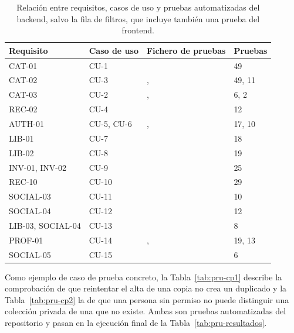 \begin{table}[htp]
\centering
\small
\begin{tabularx}{\textwidth}{ | C{0.17\textwidth} | C{0.13\textwidth} | Y | C{0.12\textwidth} | }
    \hline
    \textbf{Requisito} & \textbf{Caso de uso} & \textbf{Fichero de pruebas} & \textbf{Pruebas} \\
    \hline
    CAT-01 & CU-1 &  & 49 \\
    \hline
    CAT-02 & CU-3 & ,  & 49, 11 \\
    \hline
    CAT-03 & CU-2 & ,  & 6, 2 \\
    \hline
    REC-02 & CU-4 &  & 12 \\
    \hline
    AUTH-01 & CU-5, CU-6 & ,  & 17, 10 \\
    \hline
    LIB-01 & CU-7 &  & 18 \\
    \hline
    LIB-02 & CU-8 &  & 19 \\
    \hline
    INV-01, INV-02 & CU-9 &  & 25 \\
    \hline
    REC-10 & CU-10 &  & 29 \\
    \hline
    SOCIAL-03 & CU-11 &  & 10 \\
    \hline
    SOCIAL-04 & CU-12 &  & 12 \\
    \hline
    LIB-03, SOCIAL-04 & CU-13 &  & 8 \\
    \hline
    PROF-01 & CU-14 & ,  & 19, 13 \\
    \hline
    SOCIAL-05 & CU-15 &  & 6 \\
    \hline
\end{tabularx}
\caption{Relación entre requisitos, casos de uso y pruebas automatizadas del backend, salvo la fila de filtros, que incluye también una prueba del frontend.}
\label{tab:pru-trazabilidad}
\end{table}

Como ejemplo de caso de prueba concreto, la Tabla~\ref{tab:pru-cp1} describe la comprobación de que reintentar el
alta de una copia no crea un duplicado y la Tabla~\ref{tab:pru-cp2} la de que una persona sin permiso no puede
distinguir una colección privada de una que no existe. Ambas son pruebas automatizadas del repositorio y pasan en la
ejecución final de la Tabla~\ref{tab:pru-resultados}.

